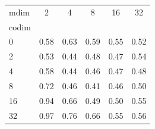 \begin{tabular}{l|ccccc}
\toprule
mdim & 2 & \textcolor{blue!70!black}{4} & 8 & 16 & 32 \\
codim &  &  &  &  &  \\
\midrule
0 & 0.58 & \textcolor{blue!70!black}{0.63} & 0.59 & 0.55 & 0.52 \\
2 & 0.53 & \textcolor{blue!70!black}{0.44} & 0.48 & 0.47 & 0.54 \\
\textcolor{red!70!black}{4} & \textcolor{red!70!black}{0.58} & \textcolor{purple!70!black}{0.44} & \textcolor{red!70!black}{0.46} & \textcolor{red!70!black}{0.47} & \textcolor{red!70!black}{0.48} \\
8 & 0.72 & \textcolor{blue!70!black}{0.46} & 0.41 & 0.46 & 0.50 \\
16 & 0.94 & \textcolor{blue!70!black}{0.66} & 0.49 & 0.50 & 0.55 \\
32 & 0.97 & \textcolor{blue!70!black}{0.76} & 0.66 & 0.55 & 0.56 \\
\bottomrule
\end{tabular}
